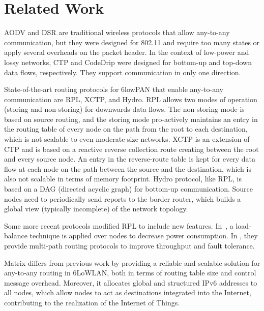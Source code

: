 \section{Related Work}
\label{sec:related}

AODV\cite{perkins2003ad} and DSR\cite{johnson2007rfc} are
traditional wireless protocols that allow any-to-any communication,
but they were designed for 802.11 and require too many states or
apply several overheads on the packet header.
In the context of low-power and lossy networks, CTP\cite{Fonseca:2009} and
CodeDrip\cite{junior2014codedrip} were designed for bottom-up and
top-down data flows, respectively. They support communication in only one
direction.

State-of-the-art routing protocols for 6lowPAN that enable
any-to-any communication are RPL\cite{rfc6550}, XCTP\cite{xctp}, and
Hydro\cite{hydro}. RPL allows two modes of operation (storing and
non-storing) for downwards data flows. The non-storing mode is based
on source routing, and the storing mode pro-actively maintains an
entry in the routing table of every node on the path from the root
to each destination, which is not scalable to even moderate-size
networks. XCTP is an extension of CTP and is based on a reactive
reverse collection route creating between the root and every source
node. An entry in the reverse-route table is kept for every data
flow at each node on the path between the source and the
destination, which is also not scalable in terms of memory
footprint. Hydro protocol, like RPL, is based on a DAG
(directed acyclic graph) for bottom-up communication. Source nodes
need to periodically send reports to the border router, which builds
a global view (typically incomplete) of the network topology.

Some more recent protocols \cite{Palani2015, Moghadam:2015:MMR:2766739.2766774,
7374975} modified RPL to include new features. In~\cite{Palani2015}, a
load-balance technique is applied over nodes to decrease power consumption. In
\cite{Moghadam:2015:MMR:2766739.2766774, 7374975}, they provide multi-path
routing protocols to improve throughput and fault tolerance.

Matrix differs from previous work by providing a reliable and scalable solution
for any-to-any routing in 6LoWLAN, both in terms of routing table size and
control message overhead. Moreover, it allocates global and structured IPv6
addresses to all nodes, which allow nodes to act as destinations integrated into
the Internet, contributing to the realization of the Internet of Things.